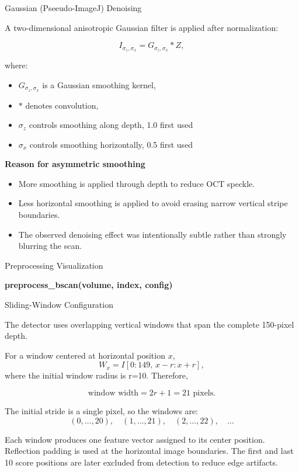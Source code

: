 \documentclass[aspectratio=169]{beamer}
\begin{document}
\begin{frame}{Gaussian (Pseeudo-ImageJ) Denoising }

A two-dimensional anisotropic Gaussian filter is applied after normalization:

\[
I_{\sigma_z,\sigma_x}
=
G_{\sigma_z,\sigma_x}
*
Z,
\]

where:

\begin{itemize}
    \item \(G_{\sigma_z,\sigma_x}\) is a Gaussian smoothing kernel,
    \item \(*\) denotes convolution,
    \item \(\sigma_z\) controls smoothing along depth, 1.0 first used
    \item \(\sigma_x\) controls smoothing horizontally, 0.5 first used
\end{itemize}

\vspace{0.3cm}

\textbf{Reason for asymmetric smoothing}

\begin{itemize}
    \item More smoothing is applied through depth to reduce OCT speckle.
    \item Less horizontal smoothing is applied to avoid erasing narrow
    vertical stripe boundaries.
    \item The observed denoising effect was intentionally subtle rather than
    strongly blurring the scan.
\end{itemize}

\end{frame}

\begin{frame}{Preprocessing Visualization}

\begin{center}
\textbf{preprocess\_bscan(volume, index, config)}
\end{center}

\end{frame}

\begin{frame}{Sliding-Window Configuration}

The detector uses overlapping vertical windows that span the complete
150-pixel depth.

For a window centered at horizontal position \(x\),
\[
W_x
=
I
\left[
0:149,\,
x-r:x+r
\right],
\]
where the initial window radius is r=10. Therefore,

\[
\text{window width}=2r+1=21 \text{ pixels}.
\]

\vspace{0.3cm}

The initial stride is a single pixel, so the windows are:
\[
(0,\ldots,20),
\quad
(1,\ldots,21),
\quad
(2,\ldots,22),
\quad \ldots
\]

Each window produces one feature vector assigned to its center position.
Reflection padding is used at the horizontal image boundaries. The first and
last 10 score positions are later excluded from detection to reduce edge
artifacts.

\end{frame}
\end{document}
